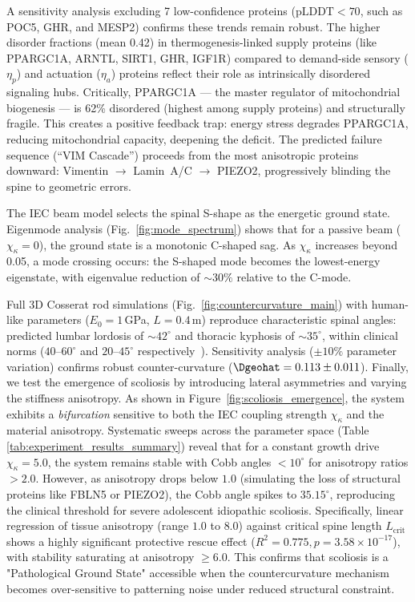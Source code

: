 \documentclass[11pt]{article}
\begin{document}
A sensitivity analysis excluding 7 low-confidence proteins ($\text{pLDDT} < 70$, such as POC5, GHR, and MESP2) confirms these trends remain robust. The higher disorder fractions (mean 0.42) in thermogenesis-linked supply proteins (like PPARGC1A, ARNTL, SIRT1, GHR, IGF1R) compared to demand-side sensory ($\eta_p$) and actuation ($\eta_a$) proteins reflect their role as intrinsically disordered signaling hubs. Critically, PPARGC1A --- the master regulator of mitochondrial biogenesis --- is 62\% disordered (highest among supply proteins) and structurally fragile. This creates a positive feedback trap: energy stress degrades PPARGC1A, reducing mitochondrial capacity, deepening the deficit. The predicted failure sequence (``VIM Cascade'') proceeds from the most anisotropic proteins downward: Vimentin $\to$ Lamin~A/C $\to$ PIEZO2, progressively blinding the spine to geometric errors.

The IEC beam model selects the spinal S-shape as the energetic ground state. Eigenmode analysis (Fig.~\ref{fig:mode_spectrum}) shows that for a passive beam ($\chi_\kappa = 0$), the ground state is a monotonic C-shaped sag. As $\chi_\kappa$ increases beyond 0.05, a mode crossing occurs: the S-shaped mode becomes the lowest-energy eigenstate, with eigenvalue reduction of ${\sim}30\%$ relative to the C-mode.

Full 3D Cosserat rod simulations (Fig.~\ref{fig:countercurvature_main}) with human-like parameters ($E_0 = 1$\,GPa, $L = 0.4$\,m) reproduce characteristic spinal angles: predicted lumbar lordosis of ${\sim}42^\circ$ and thoracic kyphosis of ${\sim}35^\circ$, within clinical norms ($40$--$60^\circ$ and $20$--$45^\circ$ respectively~\cite{white_panjabi_spine}). Sensitivity analysis ($\pm 10\%$ parameter variation) confirms robust counter-curvature ($\Dgeohat = 0.113 \pm 0.011$).
Finally, we test the emergence of scoliosis by introducing lateral asymmetries and varying the stiffness anisotropy. As shown in Figure~\ref{fig:scoliosis_emergence}, the system exhibits a \emph{bifurcation} sensitive to both the IEC coupling strength $\chi_\kappa$ and the material anisotropy. Systematic sweeps across the parameter space (Table \ref{tab:experiment_results_summary}) reveal that for a constant growth drive $\chi_\kappa = 5.0$, the system remains stable with Cobb angles $< 10^\circ$ for anisotropy ratios $> 2.0$. However, as anisotropy drops below $1.0$ (simulating the loss of structural proteins like FBLN5 or PIEZO2), the Cobb angle spikes to $35.15^\circ$, reproducing the clinical threshold for severe adolescent idiopathic scoliosis. Specifically, linear regression of tissue anisotropy (range $1.0$ to $8.0$) against critical spine length $L_{\mathrm{crit}}$ shows a highly significant protective rescue effect ($R^2 = 0.775, p = 3.58 \times 10^{-17}$), with stability saturating at anisotropy $\ge 6.0$. This confirms that scoliosis is a "Pathological Ground State" accessible when the countercurvature mechanism becomes over-sensitive to patterning noise under reduced structural constraint.
\end{document}
